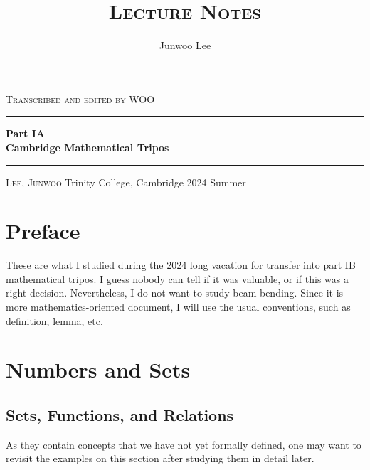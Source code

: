 \documentclass[10pt, a4paper, twoside]{report}
\title{\LARGE{\textsc{Lecture Notes}}}
\author{Junwoo Lee}
\date{}
\begin{document}
\begin{titlepage}
  \begingroup %
  \def\drop{0.1\textheight}
  \vspace*{\drop}
  \begin{center}
  {\LARGE\textsc{Transcribed and edited by WOO}}\\[\drop]
  \rule{\textwidth}{1pt}\par
  \vspace{0.5\baselineskip}
  {\huge\bfseries Part IA\\
   \large Cambridge Mathematical Tripos}\\[0.5\baselineskip]
  \rule{\textwidth}{1pt}\par
  \vfill
  {\Large\textsc{Lee, Junwoo}}
  \vfill
  Trinity College, Cambridge
  \vfill
  {\large 2024 Summer}
  \end{center}
  \endgroup
\end{titlepage}
\tableofcontents
\chapter*{Preface}
These are what I studied during the 2024 long vacation for transfer into part IB mathematical tripos. I guess nobody can tell if it was valuable, or if this was a right decision. Nevertheless, I do not want to study beam bending. Since it is more mathematics-oriented document, I will use the usual conventions, such as definition, lemma, etc.

\noindent\hrulefill\hspace{0.2cm} \floweroneleft\floweroneright \hspace{0.2cm} \hrulefill
\chapter{Numbers and Sets}
\section{Sets, Functions, and Relations}
As they contain concepts that we have not yet formally defined, one may want to revisit the examples on this section after studying them in detail later.
\end{document}
